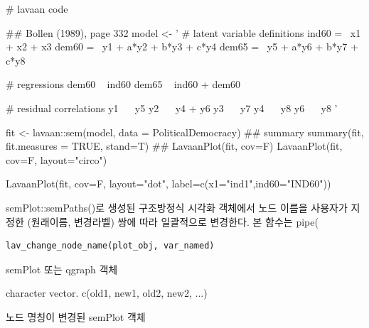 \documentclass[a4paper]{book}
\begin{document}
\begin{Examples}
\begin{ExampleCode}
# lavaan code

## Bollen (1989), page 332
model <- '
  # latent variable definitions
     ind60 =~ x1 + x2 + x3
     dem60 =~ y1 + a*y2 + b*y3 + c*y4
     dem65 =~ y5 + a*y6 + b*y7 + c*y8

  # regressions
    dem60 ~ ind60
  dem65 ~ ind60 + dem60

  # residual correlations
    y1 ~~ y5
    y2 ~~ y4 + y6
    y3 ~~ y7
    y4 ~~ y8
    y6 ~~ y8
'

fit <- lavaan::sem(model, data = PoliticalDemocracy)
 ## summary
summary(fit, fit.measures = TRUE, stand=T)
##
LavaanPlot(fit, cov=F)
LavaanPlot(fit, cov=F, layout="circo")

LavaanPlot(fit, cov=F, layout="dot",
           label=c(x1="ind1",ind60="IND60"))


\end{ExampleCode}
\end{Examples}
%
\begin{Description}
semPlot::semPaths()로 생성된 구조방정식 시각화 객체에서
노드 이름을 사용자가 지정한 (원래이름, 변경라벨) 쌍에 따라
일괄적으로 변경한다.
본 함수는 pipe(
\end{Description}
%
\begin{Usage}
\begin{verbatim}
lav_change_node_name(plot_obj, var_named)
\end{verbatim}
\end{Usage}
%
\begin{Arguments}
\begin{ldescription}
\item[\code{plot\_obj}] semPlot 또는 qgraph 객체

\item[\code{var\_named}] character vector.
c(old1, new1, old2, new2, ...)
\end{ldescription}
\end{Arguments}
%
\begin{Value}
노드 명칭이 변경된 semPlot 객체
\end{Value}
%
\end{document}
